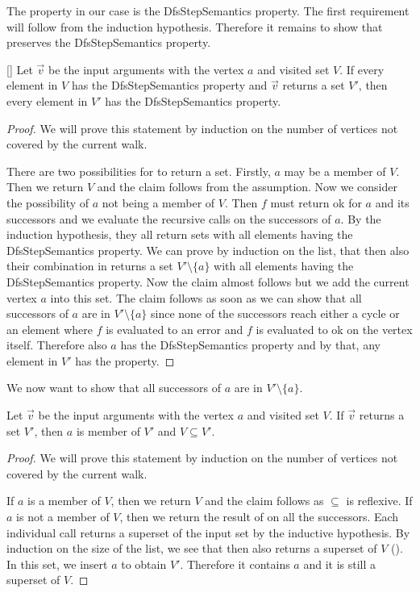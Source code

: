 The property in our case is the DfsStepSemantics property. The first requirement will follow from the induction hypothesis. Therefore it remains to show that \dfsstep preserves the DfsStepSemantics property. 

\begin{lemma}\label{lem:dfsStepProp}[\dfssteppreservesnotReachesCycleAndCounterExample]
  Let $\vec{v}$ be the input arguments with the vertex $a$ and visited set $V$. If every element in $V$ has the DfsStepSemantics property and \dfsstep $\vec{v}$ returns a set $V'$, then every element in $V'$ has the DfsStepSemantics property.
\end{lemma}
\begin{proof}
  We will prove this statement by induction on the number of vertices not covered by the current walk.

  There are two possibilities for \dfsstep to return a set. Firstly, $a$ may be a member of $V$. Then we return $V$ and the claim follows from the assumption.
  Now we consider the possibility of $a$ not being a member of $V$. Then $f$ must return ok for $a$ and its successors and we evaluate the recursive calls on the successors of $a$. By the induction hypothesis, they all return sets with all elements having the DfsStepSemantics property. We can prove by induction on the list, that then also their combination in \foldlexceptset returns a set $V' \setminus \{a\}$ with all elements having the DfsStepSemantics property. Now the claim almost follows but we add the current vertex $a$ into this set. The claim follows as soon as we can show that all successors of $a$ are in $V' \setminus \{a\}$ since none of the successors reach either a cycle or an element where $f$ is evaluated to an error and $f$ is evaluated to ok on the vertex itself. Therefore also $a$ has the DfsStepSemantics property and by that, any element in $V'$ has the property.
\end{proof}

We now want to show that all successors of $a$ are in $V' \setminus \{a\}$. 

\begin{lemma}[\dfsstepreturnsrootelement, \dfsstepsubset]
  Let $\vec{v}$ be the input arguments with the vertex $a$ and visited set $V$. If \dfsstep $\vec{v}$ returns a set $V'$, then $a$ is member of $V'$ and $V \subseteq V'$.
\end{lemma}
\begin{proof}
  We will prove this statement by induction on the number of vertices not covered by the current walk.

  If $a$ is a member of $V$, then we return $V$ and the claim follows as $\subseteq$ is reflexive.
  If $a$ is not a member of $V$, then we return the result of \foldlexceptset on all the successors. Each individual call returns a superset of the input set by the inductive hypothesis. By induction on the size of the list, we see that then also \foldlexceptset returns a superset of $V$ (\foldlexceptsetsubset). In this set, we insert $a$ to obtain $V'$. Therefore it contains $a$ and it is still a superset of $V$.
\end{proof}

